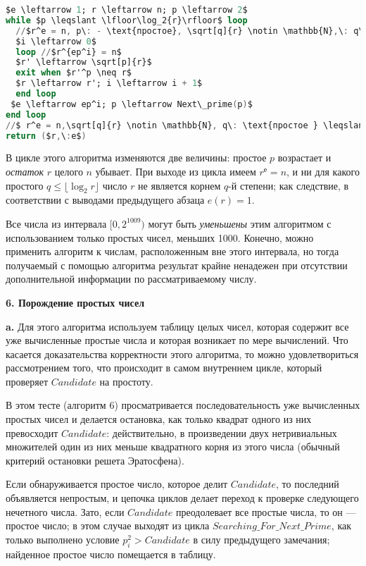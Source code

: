 \documentclass{mai_book}
\begin{document}
\begin{lstlisting}[mathescape=true, language=Ada, caption=Вычисление корня из целого числа]
$e \leftarrow 1; r \leftarrow n; p \leftarrow 2$
while $p \leqslant \lfloor\log_2{r}\rfloor$ loop
  //$r^e = n, p\: - \text{простое}, \sqrt[q]{r} \notin \mathbb{N},\: q\: \text{простое} < q$
  $i \leftarrow 0$
  loop //$r^{ep^i} = n$
  $r' \leftarrow \sqrt[p]{r}$
  exit when $r'^p \neq r$
  $r \leftarrow r'; i \leftarrow i + 1$
  end loop
 $e \leftarrow ep^i; p \leftarrow Next\_prime(p)$
end loop
//$ r^e = n,\sqrt[q]{r} \notin \mathbb{N}, q\: \text{простое } \leqslant\log_2{(r)},\: \text{значит}\: e(r) = 1$
return ($r,\:e$)
\end{lstlisting} 

В цикле этого алгоритма изменяются две величины: простое $p$ возрастает
и \textit{остаток} $r$ целого $n$ убывает. При выходе из цикла имеем $r^е = n$, и ни для
какого простого $q \leqslant \lfloor\log_2{r}\rfloor$ число $r$ не является корнем $q$-й степени; как следствие,
в соответствии с выводами предыдущего абзаца $e(r) = 1$.

Все числа из интервала $[0, 2^{1009})$ могут быть \textit{уменьшены} этим алгоритмом с использованием
только простых чисел, меньших 1000. Конечно, можно применить алгоритм к числам, расположенным
вне этого интервала, но тогда получаемый с помощью алгоритма результат крайне ненадежен при отсутствии
дополнительной информации по рассматриваемому числу.\newline

\noindent\textbf{6. Порождение простых чисел}\newline

\textbf{a.} Для этого алгоритма используем таблицу целых чисел, которая содержит
все уже вычисленные простые числа и которая возникает по мере вычислений.
Что касается доказательства корректности этого алгоритма, то можно удовлетвориться
рассмотрением того, что происходит в самом внутреннем цикле, который проверяет $Candidate$ на простоту.
\newpage

В этом тесте (алгоритм 6) просматривается последовательность уже вычисленных
простых чисел и делается остановка, как только квадрат одного из них превосходит $Candidate$:
действительно, в произведении двух нетривиальных множителей один из них меньше
квадратного корня из этого числа (обычный критерий остановки решета Эратосфена).

Если обнаруживается простое число, которое делит $Candidate$, то последний объявляется непростым,
и цепочка циклов делает переход к проверке следующего нечетного числа. Зато,
если $Candidate$ преодолевает все простые числа, то он — простое число; в этом случае
выходят из цикла $Searching\_For\_Next\_Prime$, как только выполнено условие $p^2_i > Candidate$
в силу предыдущего замечания; найденное простое число помещается в таблицу.
\end{document}
